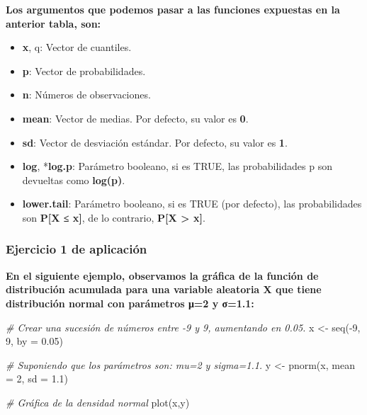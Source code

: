 \documentclass[
]{article}
\newenvironment{Shaded}{\begin{snugshade}}{\end{snugshade}}
\newcommand{\AttributeTok}[1]{\textcolor[rgb]{0.77,0.63,0.00}{#1}}
\newcommand{\CommentTok}[1]{\textcolor[rgb]{0.56,0.35,0.01}{\textit{#1}}}
\newcommand{\DecValTok}[1]{\textcolor[rgb]{0.00,0.00,0.81}{#1}}
\newcommand{\FloatTok}[1]{\textcolor[rgb]{0.00,0.00,0.81}{#1}}
\newcommand{\FunctionTok}[1]{\textcolor[rgb]{0.00,0.00,0.00}{#1}}
\newcommand{\NormalTok}[1]{#1}
\newcommand{\OtherTok}[1]{\textcolor[rgb]{0.56,0.35,0.01}{#1}}
\newcommand{\SpecialCharTok}[1]{\textcolor[rgb]{0.00,0.00,0.00}{#1}}
\begin{document}
\textbf{Los argumentos que podemos pasar a las funciones expuestas en la
anterior tabla, son:}

\begin{itemize}
\item
  \textbf{x}, q: Vector de cuantiles.
\item
  \textbf{p}: Vector de probabilidades.
\item
  \textbf{n}: Números de observaciones.
\item
  \textbf{mean}: Vector de medias. Por defecto, su valor es \textbf{0}.
\item
  \textbf{sd}: Vector de desviación estándar. Por defecto, su valor es
  \textbf{1}.
\item
  \textbf{log}, *\textbf{log.p}: Parámetro booleano, si es TRUE, las
  probabilidades p son devueltas como \textbf{log(p)}.
\item
  \textbf{lower.tail}: Parámetro booleano, si es TRUE (por defecto), las
  probabilidades son \textbf{P{[}X ≤ x{]}}, de lo contrario,
  \textbf{P{[}X \textgreater{} x{]}}.
\end{itemize}

\hypertarget{ejercicio-1-de-aplicaciuxf3n}{%
\subsubsection{Ejercicio 1 de
aplicación}\label{ejercicio-1-de-aplicaciuxf3n}}

\textbf{En el siguiente ejemplo, observamos la gráfica de la función de
distribución acumulada para una variable aleatoria X que tiene
distribución normal con parámetros μ=2 y σ=1.1:}

\begin{Shaded}
\begin{Highlighting}[]
\CommentTok{\# Crear una sucesión de números entre {-}9 y 9, aumentando en 0.05.}
\NormalTok{x }\OtherTok{\textless{}{-}} \FunctionTok{seq}\NormalTok{(}\SpecialCharTok{{-}}\DecValTok{9}\NormalTok{, }\DecValTok{9}\NormalTok{, }\AttributeTok{by =} \FloatTok{0.05}\NormalTok{)}

\CommentTok{\# Suponiendo que los parámetros son: mu=2 y sigma=1.1.}
\NormalTok{y }\OtherTok{\textless{}{-}} \FunctionTok{pnorm}\NormalTok{(x, }\AttributeTok{mean =} \DecValTok{2}\NormalTok{, }\AttributeTok{sd =} \FloatTok{1.1}\NormalTok{)}

\CommentTok{\# Gráfica de la densidad normal}
\FunctionTok{plot}\NormalTok{(x,y)}
\end{Highlighting}
\end{Shaded}
\end{document}
